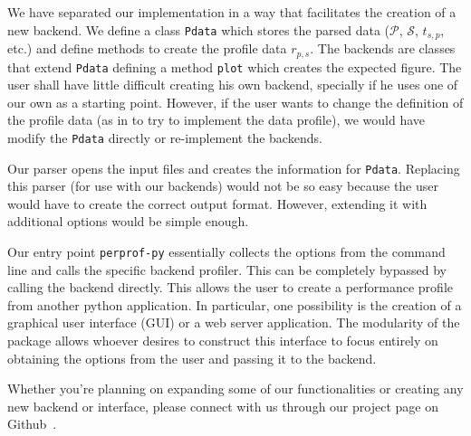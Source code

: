 We have separated our implementation in a way that facilitates the creation of a
new backend.
We define a class {\tt Pdata} which stores the parsed data ($\mathcal{P}$,
$\mathcal{S}$, $t_{s,p}$, etc.) and define methods to create the profile data
$r_{p,s}$.
The backends are classes that extend {\tt Pdata} defining a method {\tt plot}
which creates the expected figure.
The user shall have little difficult creating his own backend, specially if he
uses one of our own as a starting point.
However, if the user wants to change the definition of the profile data (as in
to try to implement the data profile), we would have modify the {\tt Pdata}
directly or re-implement the backends.

Our parser opens the input files and creates the information for {\tt Pdata}.
Replacing this parser (for use with our backends) would not be so easy
because the user would have to create the correct output format.  However,
extending it with additional options would be simple enough.

Our entry point {\tt perprof-py} essentially collects the options from the command
line and calls the specific backend profiler. This can be completely bypassed
by calling the backend directly. This allows the user to create a performance
profile from another python application. In particular, one possibility is the
creation of a graphical user interface (GUI)
or a web server application. The modularity of the package
allows whoever desires to construct this interface to focus entirely on
obtaining the options from the user and passing it to the backend.

Whether you're planning on expanding some of our functionalities or creating any
new backend or interface, please connect with us through our project page on
Github~\cite{url:perprof-py}.

